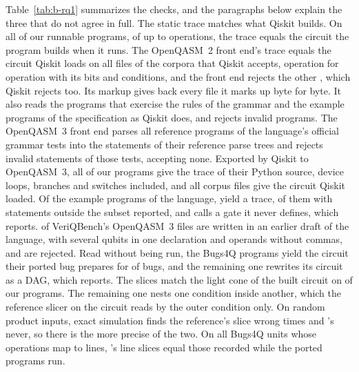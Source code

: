 Table~\ref{tab:b-rq1} summarizes the checks, and the paragraphs below explain the three that do not agree in full.
The static trace matches what Qiskit builds. On all \numToolDevPrograms{} of our runnable programs, of up to
\numToolDevMaxOps{} operations, the trace equals the circuit the program builds when it runs. The OpenQASM~2 front end's trace equals the circuit
Qiskit loads on all \numSmlSame{} files of the corpora that Qiskit accepts, operation for operation with its bits and
conditions, and the front end rejects the other \numSmlRejected{}, which Qiskit rejects too. Its markup gives back every
file it marks up byte for byte. It also reads the \numSmlGrammarCases{} programs that exercise the rules of the grammar
and the \numSmlSpecPrograms{} example programs of the specification as Qiskit does, and rejects
\numSmlInvalidCases{} invalid programs. The OpenQASM~3 front end parses all \numQthreeRefCases{} reference programs
of the language's official grammar tests into the statements of their reference parse trees and rejects
\numQthreeInvalidRejected{} invalid statements of those tests, accepting none. Exported by Qiskit to OpenQASM~3, all
\numQthreeOurs{} of our programs give the trace of their Python source, device loops, branches and switches included,
and all \numQthreeCorpus{} corpus files give the circuit Qiskit loaded. Of the \numQthreeExamples{} example programs of
the language, \numQthreeExamplesTraced{} yield a trace, \numQthreeExamplesOutside{} of them with statements outside the
subset reported, and \numQthreeExamplesReported{} calls a gate it never defines, which \tool{} reports. \numQthreeVeriqRejected{} of
VeriQBench's \numQthreeVeriqFiles{} OpenQASM~3 files are written in an earlier draft of the language, with several
qubits in one declaration and operands without commas, and are rejected. Read without
being run, the Bugs4Q programs yield the circuit their ported bug prepares for \numToolTOneExact{} of \numToolTOneBugs{}
bugs, and the remaining one rewrites its circuit as a DAG, which \tool{} reports. The slices match the light cone of the
built circuit on \numToolDevSliceEqual{} of our programs. The remaining one nests one condition inside another, which
the reference slicer on the circuit reads by the outer condition only. On \numToolNestedDraws{} random product inputs,
exact simulation finds the reference's slice wrong \numToolNestedStudyWrong{} times and \tool{}'s never, so there
\tool{} is the more precise of the two. On all \numToolTTwoUnits{} Bugs4Q units whose operations map to lines,
\tool{}'s line slices equal those recorded while the ported programs run.

